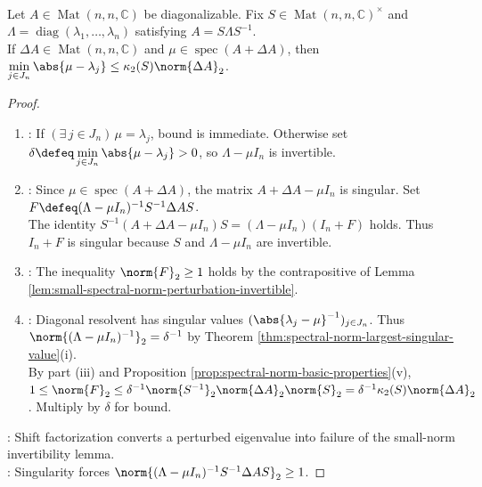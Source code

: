 \begin{theorem} \label{thm:bauer-fike-eigenvalue-perturbation} \\
Let $A\in\operatorname{Mat}(n,n,\mathbb{C})$ be diagonalizable. Fix $S\in\operatorname{Mat}(n,n,\mathbb{C})^\times$ and $\Lambda=\operatorname{diag}(\lambda_1,\ldots,\lambda_n)$ satisfying $A=S\Lambda S^{-1}$.\\
If $\Delta A\in\operatorname{Mat}(n,n,\mathbb{C})$ and $\mu\in\operatorname{spec}(A+\Delta A)$, then $\min\limits_{j\in J_n}\abs{\mu-\lambda_j}\leq\kappa_2(S)\norm{\Delta A}_2$.
\begin{proof}
\begin{enumerate}[label=(\roman*)]
\setlength{\itemsep}{0pt}
\item {}: If $(\exists\,j\in J_n)\,\mu=\lambda_j$, bound is immediate. Otherwise set $\delta\defeq\min\limits_{j\in J_n}\abs{\mu-\lambda_j}>0$, so $\Lambda-\mu I_n$ is invertible.
\item {}: Since $\mu\in\operatorname{spec}(A+\Delta A)$, the matrix $A+\Delta A-\mu I_n$ is singular. Set $F\defeq(\Lambda-\mu I_n)^{-1}S^{-1}\Delta AS$.\\
The identity $S^{-1}(A+\Delta A-\mu I_n)S=(\Lambda-\mu I_n)(I_n+F)$ holds. Thus $I_n+F$ is singular because $S$ and $\Lambda-\mu I_n$ are invertible.
\item {}: The inequality $\norm{F}_2\geq1$ holds by the contrapositive of Lemma \ref{lem:small-spectral-norm-perturbation-invertible}.
\item {}: Diagonal resolvent has singular values $(\abs{\lambda_j-\mu}^{-1})_{j\in J_n}$. Thus $\norm{(\Lambda-\mu I_n)^{-1}}_2=\delta^{-1}$ by Theorem \ref{thm:spectral-norm-largest-singular-value}(i).\\
By part (iii) and Proposition \ref{prop:spectral-norm-basic-properties}(v), $1\leq\norm{F}_2\leq\delta^{-1}\norm{S^{-1}}_2\norm{\Delta A}_2\norm{S}_2=\delta^{-1}\kappa_2(S)\norm{\Delta A}_2$. Multiply by $\delta$ for bound.
\end{enumerate}
: Shift factorization converts a perturbed eigenvalue into failure of the small-norm invertibility lemma.\\
: Singularity forces $\norm{(\Lambda-\mu I_n)^{-1}S^{-1}\Delta AS}_2\geq1$.
\end{proof}
\end{theorem}

